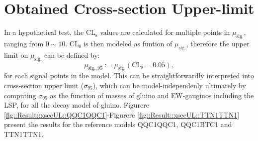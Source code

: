 \clearpage
\section{Obtained Cross-section Upper-limit}
In a hypothetical test, the $\mathrm{CL_s}$ values are calculated for multiple points in $\mu_{\mathrm{sig.}}$, ranging from $0\sim10$. $\mathrm{CL_s}$ is then modeled as funtion of $\mu_{\mathrm{sig.}}$, therefore the upper limit on $\mu_{\mathrm{sig.}}$ can be defined by:
$$
\mu_{\mathrm{sig.},95} := \mu_{\mathrm{sig.}}(\mathrm{CL_s}=0.05),
$$
for each signal points in the model.
This can be straightforwardly interpreted into cross-section upper limit ($\sigma_{95}$), which can be model-independenly ultimately by computing $\sigma_{95}$ as the function of masses of gluino and EW-gauginos including the LSP, for all the decay model of gluino. Figurere \ref{fig::Result::xsecUL::QQC1QQC1}-Figurere \ref{fig::Result::xsecUL::TTN1TTN1} present the results for the reference models QQC1QQC1, QQC1BTC1 and TTN1TTN1.



